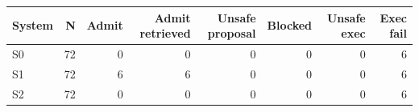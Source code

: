 \begin{tabular}{lrrrrrrr}
\toprule
System & N & Admit & Admit retrieved & Unsafe proposal & Blocked & Unsafe exec & Exec fail \\
\midrule
S0 & 72 & 0 & 0 & 0 & 0 & 0 & 6 \\
S1 & 72 & 6 & 6 & 0 & 0 & 0 & 6 \\
S2 & 72 & 0 & 0 & 0 & 0 & 0 & 6 \\
\bottomrule
\end{tabular}
